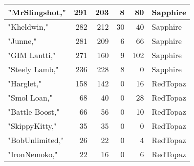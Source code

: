 \documentclass{article}
\begin{document}
\begin{table}[htbp]
\begin{tabular}{|l|r|r|r|r|l|}
"MrSlingshot," & 291 & 203 & 8 & 80 & Sapphire \\ \hline
"Kheldwin," & 282 & 212 & 30 & 40 & Sapphire \\ \hline
"Junne," & 281 & 209 & 6 & 66 & Sapphire \\ \hline
"GIM Lantti," & 271 & 160 & 9 & 102 & Sapphire \\ \hline
"Steely Lamb," & 236 & 228 & 8 & 0 & Sapphire \\ \hline
"Harglet," & 158 & 142 & 0 & 16 & RedTopaz \\ \hline
"Smol Loan," & 68 & 40 & 0 & 28 & RedTopaz \\ \hline
"Battle Boost," & 66 & 56 & 0 & 10 & RedTopaz \\ \hline
"SkippyKitty," & 35 & 35 & 0 & 0 & RedTopaz \\ \hline
"BobUnlimited," & 26 & 22 & 0 & 4 & RedTopaz \\ \hline
"IronNemoko," & 22 & 16 & 0 & 6 & RedTopaz \\ \hline
\end{tabular}
\end{table}
\end{document}
